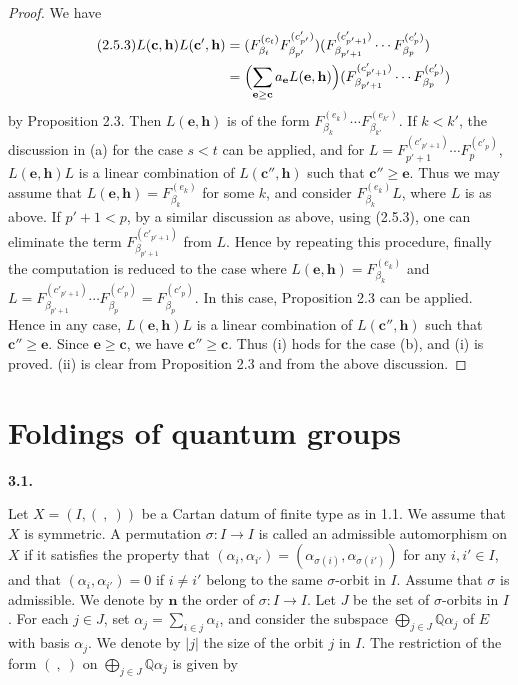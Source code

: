 \documentclass[12pt]{amsart}
\renewcommand\a{\alpha}
\renewcommand\b{\beta}
\newcommand\s{\sigma}
\renewcommand{\1}{\mathbb 1}
\newcommand{\QQ}{\mathbb Q}
\newcommand\Bh{\mathbf h}
\newcommand\Bn{\mathbf n}
\newcommand\Bc{\mathbf c}
\newcommand\Be{\mathbf e}
\numberwithin{equation}{section}
\def \para#1{\par\medskip\textbf{#1}
              \addtocounter{thm}{1}}
\begin{document}
\begin{proof}
We have
\begin{align*}
\tag{2.5.3}  
  L(\Bc,\Bh)L(\Bc',\Bh) &= (F_{\b_t}^{(c_t)}F_{\b_{p'}}^{(c'_{p'})})
                             (F_{\b_{p'+1}}^{(c'_{p'+1})}\cdots F_{\b_p}^{(c'_p)})  \\
                        &= \Bigl(\sum_{\Be \ge \Bc}a_{\Be}L(\Be, \Bh)\Bigr)
                              (F_{\b_{p'+1}}^{(c'_{p'+1})}\cdots F_{\b_p}^{(c'_p)})
\end{align*}
by Proposition 2.3.
Then $L(\Be, \Bh)$ is of the form $F_{\b_k}^{(e_k)}\cdots F_{\b_{k'}}^{(e_{k'})}$.
If $k < k'$, the discussion in (a) for the case $s < t$ can be applied, and
for $L = F_{p'+1}^{(c'_{p'+1})}\cdots F_p^{(c'_p)}$,
$L(\Be, \Bh)L$ is a linear combination of
$L(\Bc'',\Bh)$ such that $\Bc'' \ge \Be$. 
Thus we may assume that $L(\Be,\Bh) = F_{\b_k}^{(e_k)}$ for some $k$, and
consider $F_{\b_k}^{(e_k)}L$, where $L$ is as above.
If $p'+1 < p$, by a similar discussion as above, using (2.5.3), one can eliminate
the term $F_{\b_{p'+1}}^{(c'_{p'+1})}$ from $L$. Hence by repeating this procedure, finally
the computation is reduced to the case where $L(\Be,\Bh) = F_{\b_k}^{(e_k)}$ and 
$L = F_{\b_{p'+1}}^{(c'_{p'+1})}\cdots F_{\b_p}^{(c'_p)} = F_{\b_p}^{(c'_p)}$. 
In this case, Proposition 2.3 can be applied.  Hence in any case, $L(\Be,\Bh)L$ is
a linear combination of $L(\Bc'',\Bh)$ such that $\Bc''\ge \Be$. 
Since $\Be \ge \Bc$, we have $\Bc'' \ge \Bc$.  Thus (i) hods for the case (b),
and (i) is proved. 
(ii) is clear from Proposition 2.3 and from the above discussion. 
\end{proof}  

\par\bigskip
\section{ Foldings of quantum groups }

\para{3.1.}
Let $X = (I, (\ ,\ ))$ be a Cartan datum of finite type as in 1.1.
We assume that $X$ is symmetric.
A permutation $\s : I \to I$ is called an admissible automorphism on $X$
if it satisfies the property that
$(\a_i, \a_{i'}) = (\a_{\s(i)}, \a_{\s(i')})$ for any $i,i' \in I$,
and that $(\a_i, \a_{i'}) = 0$ if $i \ne i'$ belong to the same $\s$-orbit in $I$.
Assume that $\s$ is admissible. 
We denote by $\Bn$ the order of $\s: I \to I$. 
Let $J$ be the set of
$\s$-orbits in $I$. For each $j \in J$, set $\a_j = \sum_{i \in j}\a_i$,
and consider the subspace $\bigoplus_{j \in J}\QQ \a_j$ of $E$ with basis $\a_j$.
We denote by $|j|$ the size of  the orbit $j$ in $I$.
The restriction of the form $(\ ,\ )$ on $\bigoplus_{j \in J}\QQ\a_j$ is given by
\end{document}
